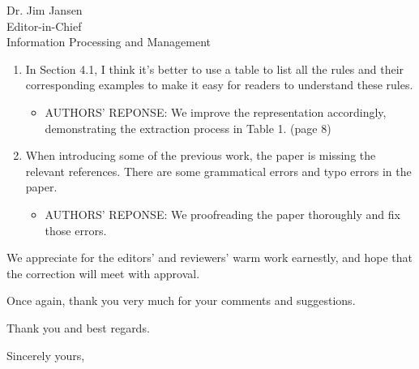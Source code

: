 \documentclass[11pt]{letter} %
\begin{document}
\begin{letter}{Dr. Jim Jansen \\
			Editor-in-Chief  \\
			Information Processing and Management}
\begin{enumerate}
			\begin{itemize}
				\item[] AUTHORS' REPONSE: We restate the problem of topic modeling based approaches as follows:
				``Although topic modeling based methods can group topically related words into one topic, it can be difficult to properly control the granularity of the topic. Thus, the performance degrades when extracting too fine-grained aspect words as prominent aspects. ''
				(page 3, line 61)
			\end{itemize}
			\item In Section 4.1, I think it's better to use a table to list all the rules and their corresponding examples to make it easy for readers to understand these rules.
			\begin{itemize}
				\item[] AUTHORS' REPONSE: We improve the representation accordingly, demonstrating
				the extraction process in Table 1. (page 8)
			\end{itemize}
			\item When introducing some of the previous work, the paper is missing the relevant references. There are some grammatical errors and typo errors in the paper.
			\begin{itemize}
				\item[] AUTHORS' REPONSE: We proofreading the paper thoroughly and fix those errors.
			\end{itemize}
		
		\end{enumerate}
	
	
		We appreciate for the editors' and reviewers' warm work earnestly,
		and hope that the correction will meet with approval.
		
		Once again, thank you very much for  your comments and suggestions.
		
		
		Thank you and best regards.
		
		\closing{Sincerely yours,}
		
		
		
		
	\end{letter}
	
\end{document}
